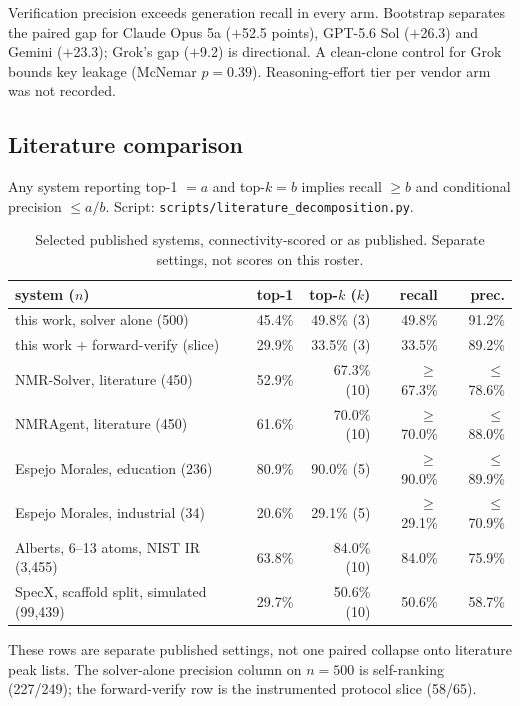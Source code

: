 \documentclass[11pt]{article}
\begin{document}
Verification precision exceeds generation recall in every arm.
Bootstrap separates the paired gap for Claude Opus 5a ($+$52.5 points),
GPT-5.6 Sol ($+$26.3) and Gemini ($+$23.3); Grok's gap ($+$9.2) is
directional.
A clean-clone control for Grok bounds key leakage (McNemar $p{=}0.39$).
Reasoning-effort tier per vendor arm was not recorded.

\subsection{Literature comparison}
\label{si:lit}

Any system reporting top-1 $= a$ and top-$k = b$ implies
recall $\geq b$ and conditional precision $\leq a/b$.
Script: \texttt{scripts/literature\_decomposition.py}.

\begin{table}[h]
\caption{Selected published systems, connectivity-scored or as published.
Separate settings, not scores on this roster.}
\centering
\scriptsize
\setlength{\tabcolsep}{4pt}
\begin{tabular}{@{}lrrrr@{}}
\toprule
system ($n$) & top-1 & top-$k$ ($k$) & recall & prec. \\
\midrule
this work, solver alone (500) & 45.4\% & 49.8\% (3) & 49.8\% & 91.2\% \\
this work + forward-verify (slice) & 29.9\% & 33.5\% (3) & 33.5\% & 89.2\% \\
NMR-Solver, literature (450) & 52.9\% & 67.3\% (10) & $\geq$67.3\% & $\leq$78.6\% \\
NMRAgent, literature (450) & 61.6\% & 70.0\% (10) & $\geq$70.0\% & $\leq$88.0\% \\
Espejo Morales, education (236) & 80.9\% & 90.0\% (5) & $\geq$90.0\% & $\leq$89.9\% \\
Espejo Morales, industrial (34) & 20.6\% & 29.1\% (5) & $\geq$29.1\% & $\leq$70.9\% \\
Alberts, 6--13 atoms, NIST IR (3,455) & 63.8\% & 84.0\% (10) & 84.0\% & 75.9\% \\
SpecX, scaffold split, simulated (99,439) & 29.7\% & 50.6\% (10) & 50.6\% & 58.7\% \\
\bottomrule
\end{tabular}
\end{table}

These rows are separate published settings, not one paired collapse onto literature peak lists.
The solver-alone precision column on $n{=}500$ is self-ranking (227/249);
the forward-verify row is the instrumented protocol slice (58/65).
\end{document}
